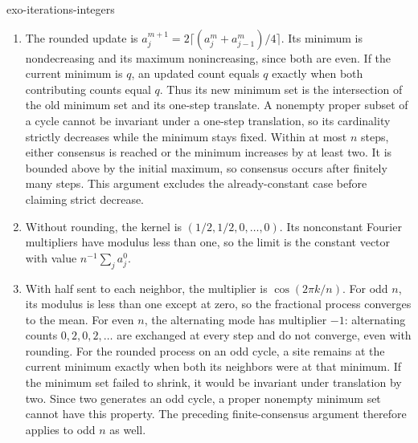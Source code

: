 \begin{correction}{exo-iterations-integers}
\begin{enumerate}
\item The rounded update is
$a_j^{m+1}=2\lceil(a_j^m+a_{j-1}^m)/4\rceil$.
Its minimum is nondecreasing and its maximum nonincreasing, since both are
even. If the current minimum is $q$, an updated count equals $q$ exactly
when both contributing counts equal $q$. Thus its new minimum set is the
intersection of the old minimum set and its one-step translate.
A nonempty proper subset of a cycle cannot be invariant under a one-step
translation, so its cardinality strictly decreases while the minimum stays
fixed. Within at most $n$ steps, either consensus is reached or the minimum
increases by at least two. It is bounded above by the initial maximum,
so consensus occurs after finitely many steps. This argument excludes the
already-constant case before claiming strict decrease.
\item Without rounding, the kernel is $(1/2,1/2,0,\ldots,0)$.
Its nonconstant Fourier multipliers have modulus less than one, so the limit
is the constant vector with value $n^{-1}\sum_ja_j^0$.
\item With half sent to each neighbor, the multiplier is
$\cos(2\pi k/n)$. For odd $n$, its modulus is less than one except at zero,
so the fractional process converges to the mean. For even $n$, the
alternating mode has multiplier $-1$: alternating counts $0,2,0,2,\ldots$
are exchanged at every step and do not converge, even with rounding.
For the rounded process on an odd cycle, a site remains at the current
minimum exactly when both its neighbors were at that minimum.
If the minimum set failed to shrink, it would be invariant under translation
by two. Since two generates an odd cycle, a proper nonempty minimum set
cannot have this property. The preceding finite-consensus argument therefore
applies to odd $n$ as well.
\end{enumerate}
\end{correction}

